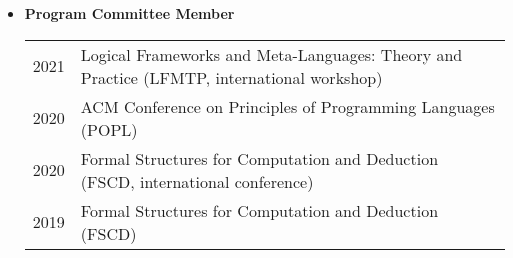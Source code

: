 \documentclass[10pt]{article}
\begin{document}
\begin{itemize}

\item[] \textbf{Program Committee Member}
\\[1.3ex]
\begin{tabular}{l@{\quad\ }p{34em}} 
  2021 & Logical Frameworks and Meta-Languages: Theory and Practice (LFMTP, international workshop)
   \\[.5ex]
 2020 & ACM Conference on Principles of Programming Languages (POPL)
 \\[.5ex]
 2020 & Formal Structures for Computation and Deduction (FSCD, international conference)
 \\[.5ex]
 2019 & Formal Structures for Computation and Deduction (FSCD)
 \\[.5ex]

\end{tabular}


\end{itemize}
\end{document}
